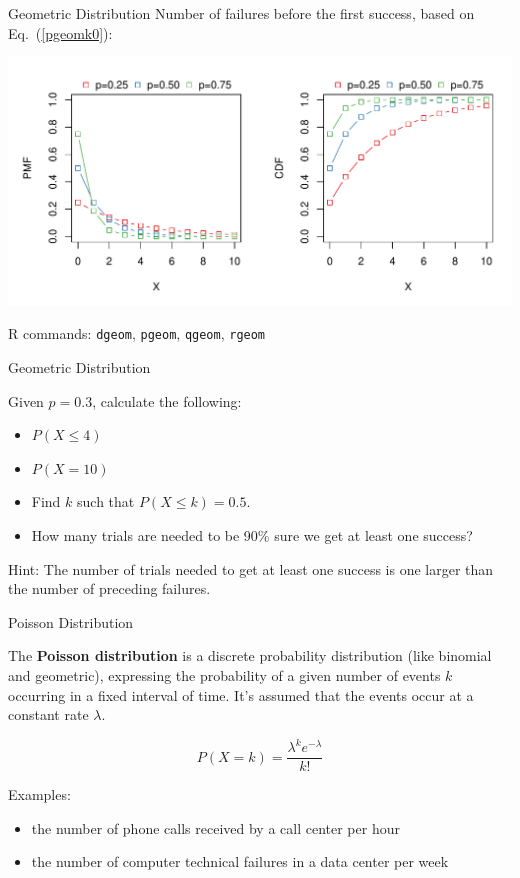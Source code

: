 \begin{frame}{Geometric Distribution}
    Number of failures before the first success, based on Eq.~(\ref{pgeomk0}):
    
    \includegraphics[width=\linewidth]{R/plots/geometric-distribution}
    
    {\tiny R commands: \texttt{dgeom}, \texttt{pgeom}, \texttt{qgeom}, \texttt{rgeom}}
\end{frame}

\begin{frame}{Geometric Distribution}
    \begin{example}
        \medskip
        Given $p=0.3$, calculate the following:
        \begin{itemize}
            \item $P(X \leq 4)$
            \item $P(X=10)$
            \item Find $k$ such that $P(X \leq k) = 0.5$.
            \item How many trials are needed to be 90\% sure we get at least one success?
        \end{itemize}
    
        {\tiny Hint: The number of trials needed to get at least one success is one larger than the number of preceding failures.}
    \end{example}
\end{frame}

\begin{frame}{Poisson Distribution}

    The \textbf{Poisson distribution} is a discrete probability distribution (like binomial and geometric), expressing the probability of a given number of events $k$ occurring in a fixed interval of time. It's assumed that the events occur at a constant rate $\lambda$. 
    
    \begin{equation}
    P(X=k) = \frac{\lambda ^ k e ^{-\lambda}}{k!}
    \end{equation}

    Examples:
    \begin{itemize}
        \item the number of phone calls received by a call center per hour
        \item the number of computer technical failures in a data center per week
    \end{itemize}
    
\end{frame}

